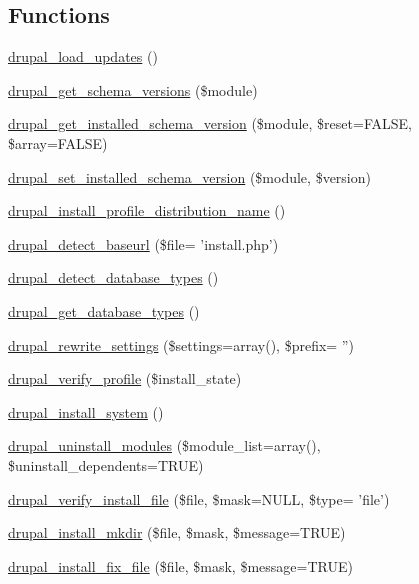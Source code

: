 \subsection*{Functions}
\begin{DoxyCompactItemize}
\item 
\hyperlink{install_8inc_a0c6d0aed425d08e6001378191d6bc1d9}{drupal\_\-load\_\-updates} ()
\item 
\hyperlink{install_8inc_a1e68a61662f821bde8606568fda7bf58}{drupal\_\-get\_\-schema\_\-versions} (\$module)
\item 
\hyperlink{install_8inc_a7702ece36adbef6e165e6f9c2bde5953}{drupal\_\-get\_\-installed\_\-schema\_\-version} (\$module, \$reset=FALSE, \$array=FALSE)
\item 
\hyperlink{install_8inc_a2bc19b43e5872bf61c359839ccaec97b}{drupal\_\-set\_\-installed\_\-schema\_\-version} (\$module, \$version)
\item 
\hyperlink{install_8inc_a52c56958ff42269107b5a678e8d95ddc}{drupal\_\-install\_\-profile\_\-distribution\_\-name} ()
\item 
\hyperlink{install_8inc_a1b5de87184840c5b386aa8f109271b9e}{drupal\_\-detect\_\-baseurl} (\$file= 'install.php')
\item 
\hyperlink{install_8inc_a714eb7ff779f55f4b330a995f9f92cd4}{drupal\_\-detect\_\-database\_\-types} ()
\item 
\hyperlink{install_8inc_acc31c9690e30c375bba969c4e5584c71}{drupal\_\-get\_\-database\_\-types} ()
\item 
\hyperlink{install_8inc_ad99864750a734251d0a39fffe620ff53}{drupal\_\-rewrite\_\-settings} (\$settings=array(), \$prefix= '')
\item 
\hyperlink{install_8inc_aa29b37a58b07628a4fd9714c2f9817ab}{drupal\_\-verify\_\-profile} (\$install\_\-state)
\item 
\hyperlink{install_8inc_aab1545a3102caedc018c7d571d6ebf1b}{drupal\_\-install\_\-system} ()
\item 
\hyperlink{install_8inc_a70bce70ff13aafba3367e81737b85b62}{drupal\_\-uninstall\_\-modules} (\$module\_\-list=array(), \$uninstall\_\-dependents=TRUE)
\item 
\hyperlink{install_8inc_a604165f37803cd10ac32534e3f8796ed}{drupal\_\-verify\_\-install\_\-file} (\$file, \$mask=NULL, \$type= 'file')
\item 
\hyperlink{install_8inc_a125c230acb8711702d23b46feab26820}{drupal\_\-install\_\-mkdir} (\$file, \$mask, \$message=TRUE)
\item 
\hyperlink{install_8inc_a41db1d979ed589c0d16bceb773e113fa}{drupal\_\-install\_\-fix\_\-file} (\$file, \$mask, \$message=TRUE)

\end{DoxyCompactItemize}
